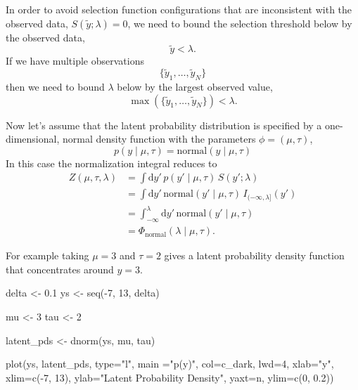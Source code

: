 \documentclass[
  letterpaper,
  DIV=11,
  numbers=noendperiod]{scrartcl}
\newenvironment{Shaded}{\begin{snugshade}}{\end{snugshade}}
\newcommand{\AttributeTok}[1]{\textcolor[rgb]{0.40,0.45,0.13}{#1}}
\newcommand{\DecValTok}[1]{\textcolor[rgb]{0.68,0.00,0.00}{#1}}
\newcommand{\FloatTok}[1]{\textcolor[rgb]{0.68,0.00,0.00}{#1}}
\newcommand{\FunctionTok}[1]{\textcolor[rgb]{0.28,0.35,0.67}{#1}}
\newcommand{\NormalTok}[1]{\textcolor[rgb]{0.00,0.23,0.31}{#1}}
\newcommand{\OtherTok}[1]{\textcolor[rgb]{0.00,0.23,0.31}{#1}}
\newcommand{\SpecialCharTok}[1]{\textcolor[rgb]{0.37,0.37,0.37}{#1}}
\newcommand{\StringTok}[1]{\textcolor[rgb]{0.13,0.47,0.30}{#1}}
\begin{document}
In order to avoid selection function configurations that are
inconsistent with the observed data, \(S(\tilde{y}; \lambda) = 0\), we
need to bound the selection threshold below by the observed data, \[
\tilde{y} < \lambda.
\] If we have multiple observations \[
\{ \tilde{y}_{1}, \ldots, \tilde{y}_{N} \}
\] then we need to bound \(\lambda\) below by the largest observed
value, \[
\max \left( \{ \tilde{y}_{1}, \ldots, \tilde{y}_{N} \} \right) < \lambda.
\]

Now let's assume that the latent probability distribution is specified
by a one-dimensional, normal density function with the parameters
\(\phi = (\mu, \tau)\), \[
p(y \mid \mu, \tau) = \text{normal}(y \mid \mu, \tau)
\] In this case the normalization integral reduces to \begin{align*}
Z(\mu, \tau, \lambda)
&=
\int \mathrm{d}y' \,
p(y' \mid \mu, \tau) \, S(y'; \lambda)
\\
&=
\int \mathrm{d}y' \,
\text{normal}(y' \mid \mu, \tau) \, I_{(-\infty, \lambda]}(y')
\\
&=
\int_{-\infty}^{\lambda} \mathrm{d}y' \, \text{normal}(y' \mid \mu, \tau)
\\
&=
\Phi_{\text{normal}}(\lambda \mid \mu, \tau).
\end{align*}

For example taking \(\mu = 3\) and \(\tau = 2\) gives a latent
probability density function that concentrates around \(y = 3\).

\begin{Shaded}
\begin{Highlighting}[]
\NormalTok{delta }\OtherTok{\textless{}{-}} \FloatTok{0.1}
\NormalTok{ys }\OtherTok{\textless{}{-}} \FunctionTok{seq}\NormalTok{(}\SpecialCharTok{{-}}\DecValTok{7}\NormalTok{, }\DecValTok{13}\NormalTok{, delta)}

\NormalTok{mu }\OtherTok{\textless{}{-}} \DecValTok{3}
\NormalTok{tau }\OtherTok{\textless{}{-}} \DecValTok{2}

\NormalTok{latent\_pds }\OtherTok{\textless{}{-}} \FunctionTok{dnorm}\NormalTok{(ys, mu, tau)}

\FunctionTok{plot}\NormalTok{(ys, latent\_pds, }\AttributeTok{type=}\StringTok{"l"}\NormalTok{, }\AttributeTok{main =}\StringTok{"p(y)"}\NormalTok{, }\AttributeTok{col=}\NormalTok{c\_dark, }\AttributeTok{lwd=}\DecValTok{4}\NormalTok{,}
     \AttributeTok{xlab=}\StringTok{"y"}\NormalTok{, }\AttributeTok{xlim=}\FunctionTok{c}\NormalTok{(}\SpecialCharTok{{-}}\DecValTok{7}\NormalTok{, }\DecValTok{13}\NormalTok{),}
     \AttributeTok{ylab=}\StringTok{"Latent Probability Density"}\NormalTok{, }\AttributeTok{yaxt=}\StringTok{\textquotesingle{}n\textquotesingle{}}\NormalTok{, }\AttributeTok{ylim=}\FunctionTok{c}\NormalTok{(}\DecValTok{0}\NormalTok{, }\FloatTok{0.2}\NormalTok{))}
\end{Highlighting}
\end{Shaded}
\end{document}
